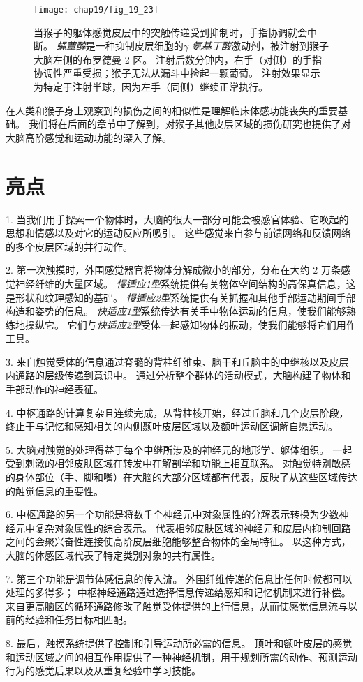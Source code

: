 \begin{figure}[htbp]
	\centering
	\texttt{[image: chap19/fig\_19\_23]}
	\caption{当猴子的躯体感觉皮层中的突触传递受到抑制时，手指协调就会中断。
		\textit{蝇蕈醇}是一种抑制皮层细胞的\textit{$\gamma$-氨基丁酸}激动剂，被注射到猴子大脑左侧的布罗德曼 2 区。
		注射后数分钟内，右手（对侧）的手指协调性严重受损；猴子无法从漏斗中捡起一颗葡萄。
		注射效果显示为特定于注射半球，因为左手（同侧）继续正常执行\cite{hikosaka1985deficits}。}
	\label{fig:19_23}
\end{figure}


在人类和猴子身上观察到的损伤之间的相似性是理解临床体感功能丧失的重要基础。 
我们将在后面的章节中了解到，对猴子其他皮层区域的损伤研究也提供了对大脑高阶感觉和运动功能的深入了解。


\section{亮点}

1. 当我们用手探索一个物体时，大脑的很大一部分可能会被感官体验、它唤起的思想和情感以及对它的运动反应所吸引。
这些感觉来自参与前馈网络和反馈网络的多个皮层区域的并行动作。


2. 第一次触摸时，外围感觉器官将物体分解成微小的部分，分布在大约 2 万条感觉神经纤维的大量区域。 
\textit{慢适应1型}系统提供有关物体空间结构的高保真信息，这是形状和纹理感知的基础。
\textit{慢适应2型}系统提供有关抓握和其他手部运动期间手部构造和姿势的信息。
\textit{快适应1型}系统传达有关手中物体运动的信息，使我们能够熟练地操纵它。
它们与\textit{快适应2型}受体一起感知物体的振动，使我们能够将它们用作工具。 


3. 来自触觉受体的信息通过脊髓的背柱纤维束、脑干和丘脑中的中继核以及皮层内通路的层级传递到意识中。 
通过分析整个群体的活动模式，大脑构建了物体和手部动作的神经表征。


4. 中枢通路的计算复杂且连续完成，从背柱核开始，经过丘脑和几个皮层阶段，终止于与记忆和感知相关的内侧颞叶皮层区域以及额叶运动区调解自愿运动。


5. 大脑对触觉的处理得益于每个中继所涉及的神经元的地形学、躯体组织。
一起受到刺激的相邻皮肤区域在转发中在解剖学和功能上相互联系。
对触觉特别敏感的身体部位（手、脚和嘴）在大脑的大部分区域都有代表，反映了从这些区域传达的触觉信息的重要性。 


6. 中枢通路的另一个功能是将数千个神经元中对象属性的分解表示转换为少数神经元中复杂对象属性的综合表示。
代表相邻皮肤区域的神经元和皮层内抑制回路之间的会聚兴奋性连接使高阶皮层细胞能够整合物体的全局特征。
以这种方式，大脑的体感区域代表了特定类别对象的共有属性。


7. 第三个功能是调节体感信息的传入流。
外围纤维传递的信息比任何时候都可以处理的多得多； 中枢神经通路通过选择信息传递给感知和记忆机制来进行补偿。
来自更高脑区的循环通路修改了触觉受体提供的上行信息，从而使感觉信息流与以前的经验和任务目标相匹配。 


8. 最后，触摸系统提供了控制和引导运动所必需的信息。
顶叶和额叶皮层的感觉和运动区域之间的相互作用提供了一种神经机制，用于规划所需的动作、预测运动行为的感觉后果以及从重复经验中学习技能。


